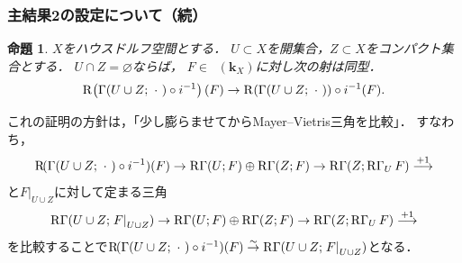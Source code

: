 \documentclass[dvipdfmx,10pt,aspectratio=169,leqno]{beamer}%
\newcommand{\kk}{\mathbf{k}}
\numberwithin{equation}{subsection}
\newcommand{\Dompl}{\mathop{\mathsf{D}^\mathrm{+}}\nolimits}
\newcommand{\RG}{\mathop{\mathrm{R}\hspace{-0pt}\Gamma}\nolimits}
\newcommand{\Rder}[1][]{\mathop{\mathrm{R}^{#1}\hspace{-2pt}}\nolimits}
\newcommand{\simar}{\mathrel{\overset{\sim}{\rightarrow}}}%
\newcommand{\blk}{\mathord{\ \cdot\ }}
\newcommand{\mres}[2][]{{\left.{#1}\right\rvert}_{#2}}
\theoremstyle{mystyle}
\newtheorem{PRP}[AXM]{命題}
\begin{document}
\begin{frame}
  \frametitle{主結果2の設定について（続）}
  \begin{PRP}
    \(X\)をハウスドルフ空間とする．
    \(U\subset X\)を開集合，\(Z\subset X\)をコンパクト集合とする．
    \(U\cap Z=\varnothing\)ならば，
    \(F\in\Dompl(\kk_{X})\)に対し次の射は同型．\[
      \Rder[]\left(\Gamma(U\cup Z;\blk)\circ i^{-1}\right)(F)
      \to
      \Rder[]{(\Gamma(U\cup Z;\blk))}\circ i^{-1}(F).
    \]
  \end{PRP}
  これの証明の方針は，「少し膨らませてからMayer--Vietris三角を比較」．
  すなわち，
  \[
    \Rder(\Gamma(U\cup Z;\blk)\circ i^{-1})(F)
    \to \RG(U;F)\oplus\RG(Z;F)
    \to \RG(Z;\RG_{U}F)
    \overset{+1}{\longrightarrow}
  \]
  と\(\mres[F]{U\cup Z}\)に対して定まる三角
  \[
    \RG(U\cup Z;\mres[F]{U\cup Z})
    \to \RG(U;F)\oplus\RG(Z;F)
    \to \RG(Z;\RG_{U}F)
    \overset{+1}{\longrightarrow}
  \]を比較することで\(
    \Rder(\Gamma(U\cup Z;\blk)\circ i^{-1})(F)
    \simar
    \RG(U\cup Z;\mres[F]{U\cup Z})
  \)となる．
\end{frame}

\end{document}
